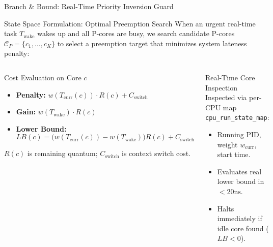 \documentclass{beamer}
\begin{document}
\begin{frame}{Branch \& Bound: Real-Time Priority Inversion Guard}
  \begin{block}{State Space Formulation: Optimal Preemption Search}
    \footnotesize
    When an urgent real-time task $T_{\text{wake}}$ wakes up and all P-cores are busy, we search candidate P-cores $\mathcal{C}_P = \{c_1, \dots, c_K\}$ to select a preemption target that minimizes system lateness penalty:
  \end{block}

  \vspace{0.15cm}
  \begin{columns}[T]
      \begin{block}{\small Cost Evaluation on Core $c$}
        \scriptsize
        \begin{itemize}\itemsep2pt\tiny
          \item \textbf{Penalty:} $w(T_{\text{curr}}(c)) \cdot R(c) + C_{\text{switch}}$
          \item \textbf{Gain:} $w(T_{\text{wake}}) \cdot R(c)$
          \item \textbf{Lower Bound:}
                $$LB(c) = \big( w(T_{\text{curr}}(c)) - w(T_{\text{wake}}) \big) R(c) + C_{\text{switch}}$$
        \end{itemize}
        $R(c)$ is remaining quantum; $C_{\text{switch}}$ is context switch cost.
      \end{block}

      \begin{exampleblock}{\small Real-Time Core Inspection}
        \scriptsize
        Inspected via per-CPU map \texttt{cpu\_run\_state\_map}:
        \begin{itemize}\itemsep2pt\tiny
          \item Running PID, weight $w_{\text{curr}}$, start time.
          \item Evaluates real lower bound in $< 20\text{ns}$.
          \item Halts immediately if idle core found ($LB < 0$).
        \end{itemize}
      \end{exampleblock}
  \end{columns}
\end{frame}
\end{document}
